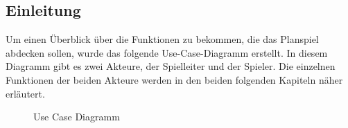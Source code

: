 \subsection{Einleitung}
\label{sec:fachkonzept-usecase-einleitung}

Um einen Überblick über die Funktionen zu bekommen, die das Planspiel abdecken sollen, wurde das folgende Use-Case-Diagramm erstellt. In diesem Diagramm gibt es zwei Akteure, der Spielleiter und der Spieler. Die einzelnen Funktionen der beiden Akteure werden in den beiden folgenden Kapiteln näher erläutert.

\begin{figure}[h]
  \centering
  \caption{Use Case Diagramm}
  \label{img:fachkonzept-usecase}
\end{figure}
